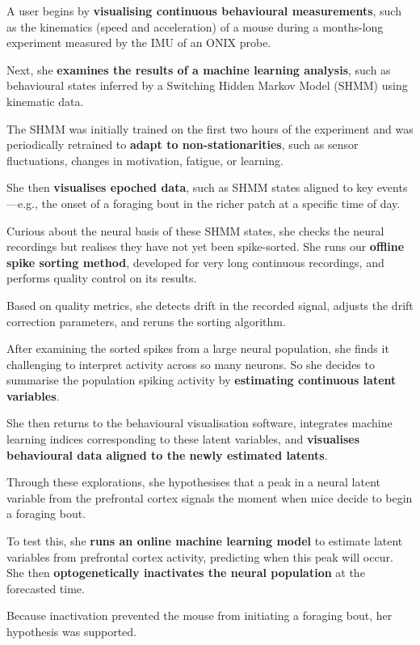\documentclass{article}
\begin{document}
A user begins by \textbf{visualising continuous behavioural measurements},
such as the kinematics (speed and acceleration) of a mouse during a
months-long experiment measured by the IMU of an ONIX probe.

Next, she \textbf{examines the results of a machine learning analysis},
such as behavioural states inferred by a Switching Hidden Markov Model (SHMM)
using kinematic data.

The SHMM was initially trained on the first two hours of the experiment
and was periodically retrained to \textbf{adapt to non-stationarities},
such as sensor fluctuations, changes in motivation, fatigue, or learning.

She then \textbf{visualises epoched data}, such as SHMM states aligned to
key events—e.g., the onset of a foraging bout in the richer patch at a
specific time of day.

Curious about the neural basis of these SHMM states, she checks the neural
recordings but realises they have not yet been spike-sorted. She runs our
\textbf{offline spike sorting method}, developed for very long continuous
recordings, and performs quality control on its results.

Based on quality metrics, she detects drift in the recorded signal,
adjusts the drift correction parameters, and reruns the sorting algorithm.

		After examining the sorted spikes from a large neural population,  she
finds it challenging to interpret activity across so many neurons.  So she
decides to summarise the population spiking activity by \textbf{estimating
continuous latent variables}.

She then returns to the behavioural visualisation software, integrates
machine learning indices corresponding to these latent variables, and
\textbf{visualises behavioural data aligned to the newly estimated latents}.

Through these explorations, she hypothesises that a peak in a neural latent
variable from the prefrontal cortex signals the moment when mice decide
to begin a foraging bout.

To test this, she \textbf{runs an online machine learning model} to estimate
latent variables from prefrontal cortex activity, predicting when this
peak will occur. She then \textbf{optogenetically inactivates the neural
population} at the forecasted time.

Because inactivation prevented the mouse from initiating a foraging bout,
her hypothesis was supported.
\end{document}
